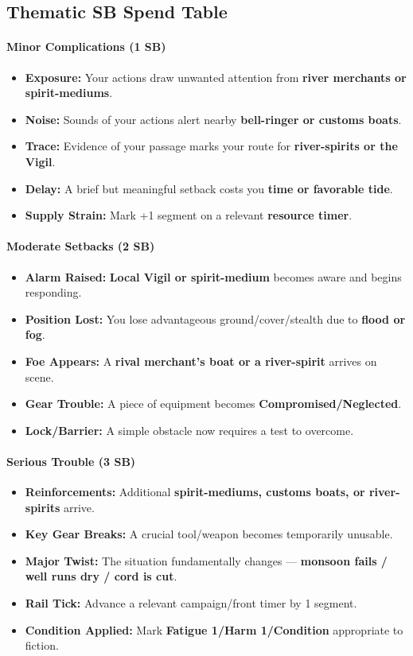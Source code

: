 \subsection*{Thematic SB Spend Table}
\label{sec:ayokha-sb}

\paragraph{Minor Complications (1 SB)}
\begin{itemize}
\item \textbf{Exposure:} Your actions draw unwanted attention from \textbf{river merchants or spirit-mediums}.
\item \textbf{Noise:} Sounds of your actions alert nearby \textbf{bell-ringer or customs boats}.
\item \textbf{Trace:} Evidence of your passage marks your route for \textbf{river-spirits or the Vigil}.
\item \textbf{Delay:} A brief but meaningful setback costs you \textbf{time or favorable tide}.
\item \textbf{Supply Strain:} Mark +1 segment on a relevant \textbf{resource timer}.
\end{itemize}

\paragraph{Moderate Setbacks (2 SB)}
\begin{itemize}
\item \textbf{Alarm Raised:} \textbf{Local Vigil or spirit-medium} becomes aware and begins responding.
\item \textbf{Position Lost:} You lose advantageous ground/cover/stealth due to \textbf{flood or fog}.
\item \textbf{Foe Appears:} A \textbf{rival merchant's boat or a river-spirit} arrives on scene.
\item \textbf{Gear Trouble:} A piece of equipment becomes \textbf{Compromised/Neglected}.
\item \textbf{Lock/Barrier:} A simple obstacle now requires a test to overcome.
\end{itemize}

\paragraph{Serious Trouble (3 SB)}
\begin{itemize}
\item \textbf{Reinforcements:} Additional \textbf{spirit-mediums, customs boats, or river-spirits} arrive.
\item \textbf{Key Gear Breaks:} A crucial tool/weapon becomes temporarily unusable.
\item \textbf{Major Twist:} The situation fundamentally changes --- \textbf{monsoon fails / well runs dry / cord is cut}.
\item \textbf{Rail Tick:} Advance a relevant campaign/front timer by 1 segment.
\item \textbf{Condition Applied:} Mark \textbf{Fatigue 1/Harm 1/Condition} appropriate to fiction.
\end{itemize}

